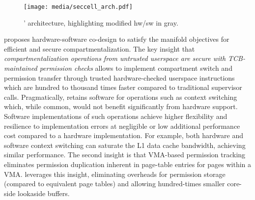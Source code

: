 \begin{figure}
  \centering
  \texttt{[image: media/seccell\_arch.pdf]}
  \caption{\seccells' architecture, highlighting modified hw/sw in gray.}
  \label{fig:seccell_arch}
\end{figure}

\seccells proposes hardware-software co-design to satisfy the
manifold objectives for efficient and secure compartmentalization.
The key insight that \emph{compartmentalization operations from untrusted userspace
are secure with TCB-maintained permission checks} allows \seccells to
implement compartment switch and permission transfer through
trusted hardware-checked userspace instructions which are
hundred to thousand times faster compared to traditional supervisor calls.
Pragmatically, \seccells retains software for operations such as 
context switching which, while common, would not benefit significantly 
from hardware support.
Software implementations of such operations achieve higher flexibility and
resilience to implementation errors at negligible or low additional performance
cost compared to a hardware implementation.
For example, both hardware and software context switching can saturate
the L1 data cache bandwidth, achieving similar performance.
The second insight is that VMA-based permission tracking eliminates 
permission duplication inherent in page-table entries for pages 
within a VMA.
\seccells leverages this insight, eliminating overheads for 
permission storage (compared to equivalent page tables) and 
allowing hundred-times smaller core-side lookaside buffers. 

